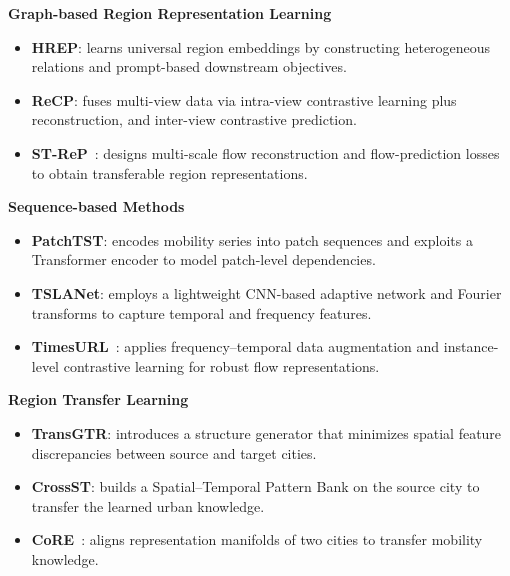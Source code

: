 \noindent\textbf{Graph-based Region Representation Learning}
\begin{itemize}
\item \textbf{HREP}\cite{HREP}: learns universal region embeddings by constructing heterogeneous relations and prompt-based downstream objectives.
\item \textbf{ReCP}\cite{ReCP}: fuses multi-view data via intra-view contrastive learning plus reconstruction, and inter-view contrastive prediction.
\item \textbf{ST-ReP}~\cite{ST-ReP}: designs multi-scale flow reconstruction and flow-prediction losses to obtain transferable region representations.
\end{itemize}

\noindent\textbf{Sequence-based Methods}
\begin{itemize}
\item \textbf{PatchTST}\cite{PatchTST}: encodes mobility series into patch sequences and exploits a Transformer encoder to model patch-level dependencies.
\item \textbf{TSLANet}\cite{TSLANet}: employs a lightweight CNN-based adaptive network and Fourier transforms to capture temporal and frequency features.
\item \textbf{TimesURL}~\cite{TimesURL}: applies frequency–temporal data augmentation and instance-level contrastive learning for robust flow representations.
\end{itemize}



\noindent\textbf{Region Transfer Learning}
\begin{itemize}
\item \textbf{TransGTR}\cite{TransGTR}: introduces a structure generator that minimizes spatial feature discrepancies between source and target cities.
\item \textbf{CrossST}\cite{CrossST}: builds a Spatial–Temporal Pattern Bank on the source city to transfer the learned urban knowledge.
\item \textbf{CoRE}~\cite{CoRE}: aligns representation manifolds of two cities to transfer mobility knowledge.
\end{itemize}




